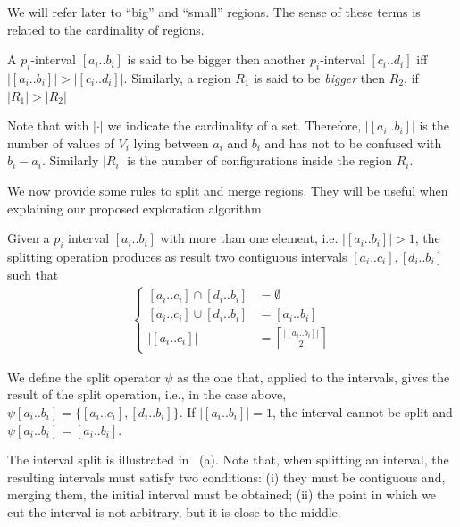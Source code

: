 We will refer later to ``big'' and ``small'' regions. The sense
of these terms is related to the cardinality of regions.
\begin{definition}
A $p_{i}$-interval $\left[a_{i}..b_{i}\right]$
is said to be bigger then another $p_{i}$-interval $\left[c_{i}..d_{i}\right]$
iff 
$\left|\left[a_{i}..b_{i}\right]\right|>\left|\left[c_{i}..d_{i}\right]\right|$.
Similarly, a region $R_{1}$ is said to be \emph{bigger }then $R_{2}$, if
$\left|R_{1}\right|>\left|R_{2}\right|$
\end{definition}
Note that with $|\cdot|$ we indicate the cardinality of a set. Therefore, $\left|\left[a_{i}..b_{i}\right]\right|$ is the number of values of $V_i$ lying between $a_{i}$ and $b_{i}$ and has not to be confused with $b_i - a_i$.
Similarly $\left|R_{i}\right|$ is the number of configurations inside the region $R_i$.

We now provide some rules to split and merge regions. They will be
useful when explaining our proposed exploration algorithm.
\begin{definition}
Given a $p_i$ interval $\left[a_{i}..b_{i}\right]$ with more than one element, i.e. $\left|\left[a_{i}..b_{i}\right]\right|>1$, the splitting operation produces as result two contiguous intervals $\left[a_{i}..c_{i}\right],\left[d_{i}..b_{i}\right]$
 such that
	\begin{align}
		\begin{cases}
		\left[a_{i}..c_{i}\right]\cap\left[d_{i}..b_{i}\right] & =\emptyset\\
		\left[a_{i}..c_{i}\right]\cup\left[d_{i}..b_{i}\right] & =\left[a_{i}..b_{i}\right]\\
		\left|\left[a_{i}..c_{i}\right]\right| & =\left\lceil \frac{\left|\left[a_{i}..b_{i}\right]\right|}{2}\right\rceil 
		\end{cases}
	\end{align}

We define the split operator $\psi$ as the one that, applied to the intervals, gives the result of the split operation, i.e., in the case above, $\psi \left[a_{i}..b_{i}\right]=\lbrace \left[a_{i}..c_{i}\right],\left[d_{i}..b_{i}\right] \rbrace$.
If $\left|\left[a_{i}..b_{i}\right]\right|=1$, the interval
cannot be split and $\psi \left[a_{i}..b_{i}\right]=\left[a_{i}..b_{i}\right]$.
\end{definition}

The interval split is illustrated in ~(a). Note that, when splitting an interval, the resulting intervals must satisfy two conditions: (i) they must be contiguous and, merging them, the initial interval must be obtained; (ii) the point in which we cut the interval is not arbitrary, but it is close to the middle.


